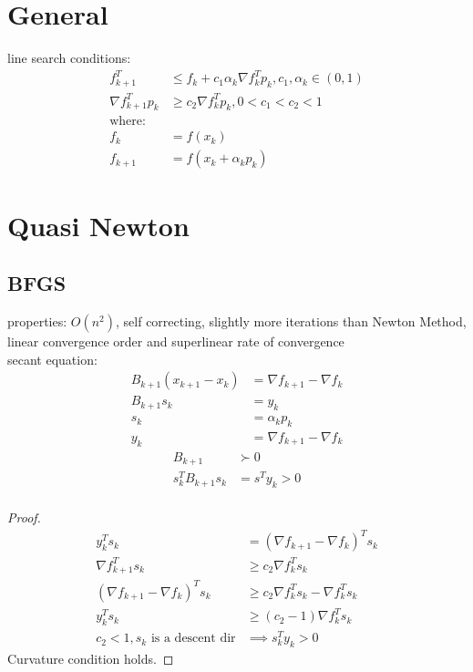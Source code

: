 \documentclass[8pt,letter]{article}
\begin{document}

\begin{multicols*}{2}

  \section{General}

  line search conditions:
  \begin{align}
    f_{k+1}^T & \leq f_k + c_1 \alpha_k \nabla f_k^T p_k, c_1,\alpha_k \in (0,1)\\
    \nabla f_{k+1}^T p_k & \geq c_2 \nabla f_k^T p_k, 0<c_1<c_2<1\\
    \text{where}:&\\
    f_{k} & = f(x_k)\\
    f_{k+1} & = f(x_k+\alpha_k p_k)
  \end{align}

  \section{Quasi Newton}

  \subsection{BFGS}
  properties: $O(n^2)$, self correcting, slightly more iterations than Newton Method, linear convergence order and superlinear rate of convergence\\
  
  secant equation:
  \begin{align*}
    B_{k+1}(x_{k+1}-x_k) & =\nabla f_{k+1} - \nabla f_k\\
    B_{k+1} s_k & = y_k\\
    s_k & = \alpha_k p_k\\
    y_k & = \nabla f_{k+1} - \nabla f_k
  \end{align*}
  \begin{align*}
    B_{k+1} & \succ 0\\
    s_k^T B_{k+1} s_k & = s^T y_k > 0\\
  \end{align*}    
  \begin{proof}
    \begin{align*}
      y_k^T s_k & = (\nabla f_{k+1} - \nabla f_k)^T s_k\\
      \nabla f_{k+1}^T s_k & \geq c_2 \nabla f_k^T s_k\\
      (\nabla f_{k+1} - \nabla f_k)^T s_k & \geq c_2 \nabla f_k^T s_k - \nabla f_k^T s_k\\
      y_k^T s_k & \geq (c_2-1) \nabla f_k^T s_k\\
      c_2 < 1, s_k \text{ is a descent dir}& \implies s_k^T y_k > 0
    \end{align*}
    Curvature condition holds.
  \end{proof}


\end{multicols*}
\end{document}
